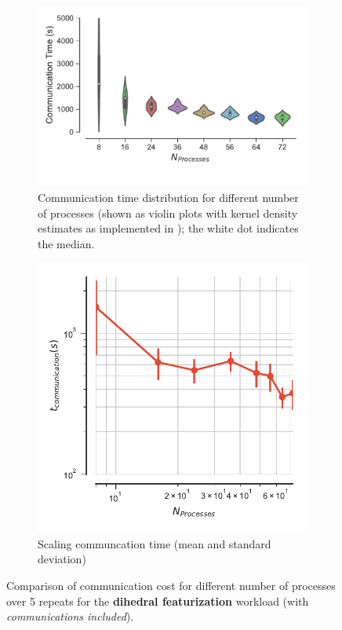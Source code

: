 \begin{figure}[tbp]
\begin{subfigure} {.55\textwidth}
  \centering
  \includegraphics[width=\linewidth]{figures/ViolinPlot-Ncores-comparison-comm-dihedral.pdf}
  \caption{Communication time distribution for different number of
    processes (shown as violin plots \protect\cite{Hintze:1998tw}
    with kernel density estimates as implemented in
    ); the white dot indicates the median.}
\end{subfigure}
\hfill
\begin{subfigure}{.35\textwidth}
  \centering
  \includegraphics[width=\linewidth]{figures/t_comm_mean-dihedral.pdf}
  \caption{Scaling communcation time (mean and standard deviation)}
\end{subfigure}
\caption{Comparison of communication cost for different number of
  processes over 5 repeats for the \textbf{dihedral featurization}
  workload (with \emph{communications included}).}
\label{fig:comparison-t_comm-dihedral}
\end{figure}

